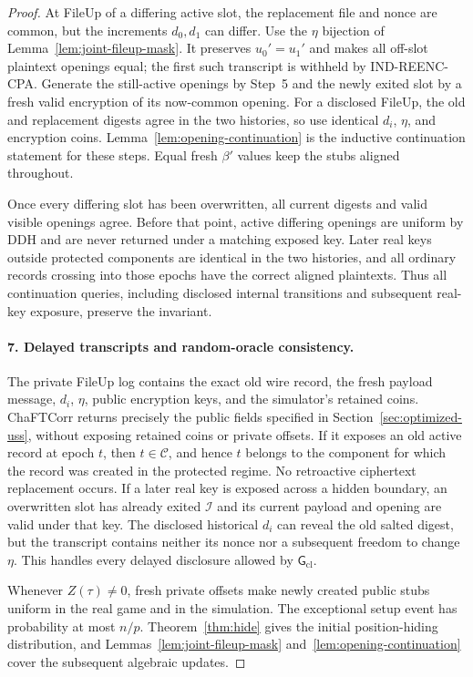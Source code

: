 \begin{proof}
At FileUp of a differing active slot, the replacement file and nonce are common, but the increments $d_0,d_1$ can differ. Use the $\eta$ bijection of Lemma~\ref{lem:joint-fileup-mask}. It preserves $u_0'=u_1'$ and makes all off-slot plaintext openings equal; the first such transcript is withheld by IND-REENC-CPA. Generate the still-active openings by Step~5 and the newly exited slot by a fresh valid encryption of its now-common opening. For a disclosed FileUp, the old and replacement digests agree in the two histories, so use identical $d_i$, $\eta$, and encryption coins. Lemma~\ref{lem:opening-continuation} is the inductive continuation statement for these steps. Equal fresh $\beta'$ values keep the stubs aligned throughout.

Once every differing slot has been overwritten, all current digests and valid visible openings agree. Before that point, active differing openings are uniform by DDH and are never returned under a matching exposed key. Later real keys outside protected components are identical in the two histories, and all ordinary records crossing into those epochs have the correct aligned plaintexts. Thus all continuation queries, including disclosed internal transitions and subsequent real-key exposure, preserve the invariant.

\paragraph{7. Delayed transcripts and random-oracle consistency.}
The private FileUp log contains the exact old wire record, the fresh payload message, $d_i$, $\eta$, public encryption keys, and the simulator's retained coins. ChaFTCorr returns precisely the public fields specified in Section~\ref{sec:optimized-uss}, without exposing retained coins or private offsets. If it exposes an old active record at epoch $t$, then $t\in\mathcal C$, and hence $t$ belongs to the component for which the record was created in the protected regime. No retroactive ciphertext replacement occurs. If a later real key is exposed across a hidden boundary, an overwritten slot has already exited $\mathcal I$ and its current payload and opening are valid under that key. The disclosed historical $d_i$ can reveal the old salted digest, but the transcript contains neither its nonce nor a subsequent freedom to change $\eta$. This handles every delayed disclosure allowed by $\mathsf G_{\mathrm{cl}}$.

Whenever $Z(\tau)\ne0$, fresh private offsets make newly created public stubs uniform in the real game and in the simulation. The exceptional setup event has probability at most $n/p$. Theorem~\ref{thm:hide} gives the initial position-hiding distribution, and Lemmas~\ref{lem:joint-fileup-mask} and~\ref{lem:opening-continuation} cover the subsequent algebraic updates.


\end{proof}
